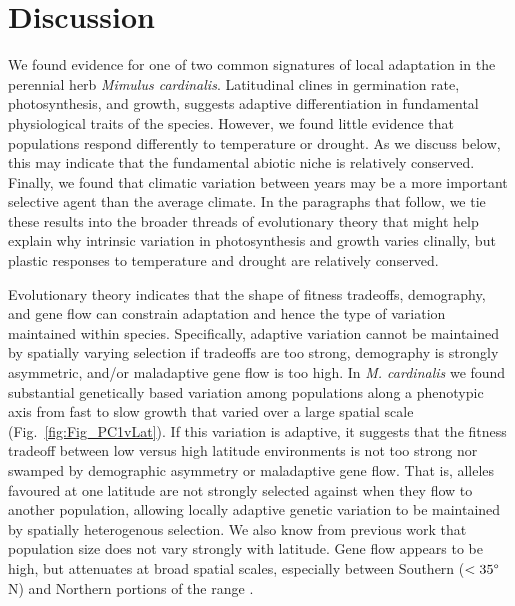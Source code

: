 \documentclass[11pt, oneside]{article}
\newcommand{\ala}[1]{{ \color{blue} [{\bf{ALA:}} {\em#1}]}} %
\begin{document}

\section*{Discussion}

We found evidence for one of two common signatures of local adaptation in the perennial herb \textit{Mimulus cardinalis}. Latitudinal clines in germination rate, photosynthesis, and growth, suggests adaptive differentiation in fundamental physiological traits of the species. However, we found little evidence that populations respond differently to temperature or drought. As we discuss below, this may indicate that the fundamental abiotic niche is relatively conserved. Finally, we found that climatic variation between years may be a more important selective agent than the average climate. In the paragraphs that follow, we tie these results into the broader threads of evolutionary theory that might help explain why intrinsic variation in photosynthesis and growth varies clinally, but plastic responses to temperature and drought are relatively conserved.

Evolutionary theory indicates that the shape of fitness tradeoffs, demography, and gene flow can constrain adaptation \citep{Levins_1968, Ronce_Kirkpatrick_2001} and hence the type of variation maintained within species. Specifically, adaptive variation cannot be maintained by spatially varying selection if tradeoffs are too strong, demography is strongly asymmetric, and/or maladaptive gene flow is too high. In \textit{M. cardinalis} we found substantial genetically based variation among populations along a phenotypic axis from fast to slow growth that varied over a large spatial scale (Fig.~\ref{fig:Fig_PC1vLat}). If this variation is adaptive, it suggests that the fitness tradeoff between low versus high latitude environments is not too strong nor swamped by demographic asymmetry or maladaptive gene flow. That is, alleles favoured at one latitude are not strongly selected against when they flow to another population, allowing locally adaptive genetic variation to be maintained by spatially heterogenous selection. We also know from previous work that population size does not vary strongly with latitude. Gene flow appears to be high, but attenuates at broad spatial scales, especially between Southern ($<35\degree$N) and Northern portions of the range \citep{Paul_etal_2016}. 
\end{document}
